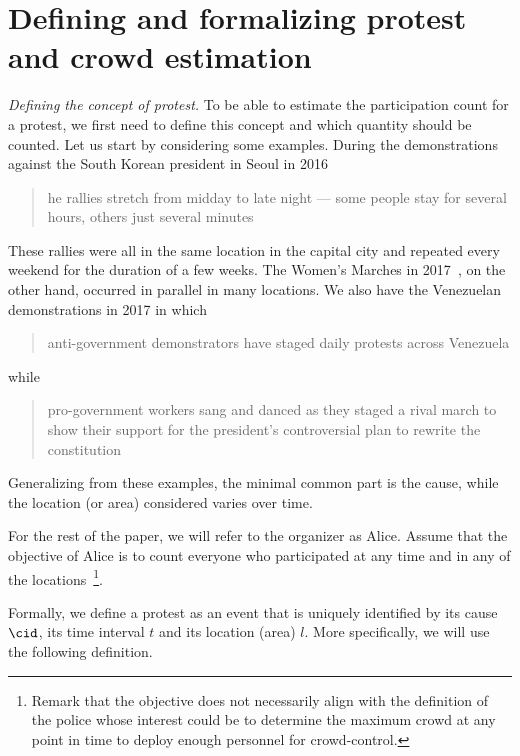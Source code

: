 \section{Defining and formalizing protest and crowd estimation}%
\label{SystemModel}


\emph{Defining the concept of protest.} 
To be able to estimate the participation count for a protest, we first need to define this concept and which quantity should be counted.
Let us start by considering some examples.
During the demonstrations against the South Korean president in Seoul in 2016
\blockcquote{2016DemonstrationsInSeoul}{%
  he rallies stretch from midday to late night --- some people stay for several hours, others just several minutes%
}.
These rallies were all in the same location in the capital city and repeated every weekend for the duration of a few weeks.
The Women's Marches in 2017~\cite{2017WomensMarchesInUS}, on the other hand, occurred in parallel in many locations.
We also have the Venezuelan demonstrations in 2017 in which \blockcquote{2017VenezuelaProtestFrequency}{%
  anti-government demonstrators have staged daily protests across Venezuela%
} while
\blockcquote{AlJazeeraOnVenezuela2017}{%
  pro-government workers sang and danced as they staged a rival march to show their support for the president's controversial plan to rewrite the constitution%
}.
Generalizing from these examples, the minimal common part is the cause, \label{CauseIsTheCommonDenominator} while the location (or area) considered varies over time.

For the rest of the paper, we will refer to the organizer as Alice.
Assume that the objective of Alice is to count everyone who participated at any time and in any of the locations~\cite{2016DemonstrationsInSeoul}\footnote{Remark that the objective does not necessarily align with the definition of the police whose interest could be to determine the maximum crowd at any point in time to deploy enough personnel for crowd-control.}.


Formally, we define a protest as an event that is uniquely identified by its cause \(\cid\), its time interval \(t\) and its location (area) \(l\).
More specifically, we will use the following definition.

